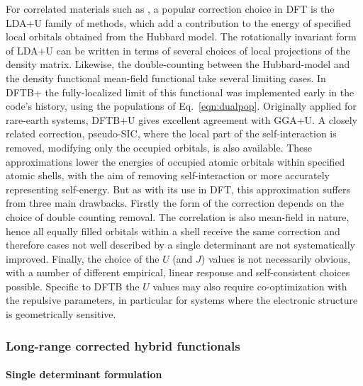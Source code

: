 \documentclass{revtex4-1}
\newcommand{\dftbp}{DFTB+}
\begin{document}
For correlated materials such as , a popular correction choice in DFT is
the LDA+U family of methods,\cite{Anisimov_1997} which add a contribution to the
energy of specified local orbitals obtained from the Hubbard model. The
rotationally invariant\cite{PhysRevB.57.1505} form of LDA+U can be written in
terms of several choices of local projections of the density
matrix.\cite{PhysRevB.73.045110} Likewise, the double-counting between the
Hubbard-model and the density functional mean-field functional take several
limiting cases.\cite{PhysRevB.67.153106} In \dftbp{} the fully-localized limit
of this functional was implemented early in the code's
history,\cite{hourahine07} using the populations of
Eq.~\eqref{eqn:dualpop}. Originally applied for rare-earth
systems,\cite{doi:10.1002/pssc.200778667} DFTB+U gives excellent agreement with
GGA+U.\cite{doi:10.1063/1.5085190} A closely related correction,
pseudo-SIC,\cite{PhysRevB.67.125109} where the local part of the
self-interaction is removed, modifying only the occupied orbitals, is also
available.  These approximations lower the energies of occupied atomic orbitals
within specified atomic shells, with the aim of removing self-interaction or
more accurately representing self-energy. But as with its use in DFT, this
approximation suffers from three main drawbacks. Firstly the form of the
correction depends on the choice of double counting
removal.\cite{PhysRevB.79.035103} The correlation is also mean-field in nature,
hence all equally filled orbitals within a shell receive the same correction and
therefore cases not well described by a single determinant are not
systematically improved. Finally, the choice of the $U$ (and $J$) values is not
necessarily obvious, with a number of different empirical, linear response and
self-consistent choices possible. Specific to
DFTB\cite{doi:10.1021/acs.jpcc.6b10557} the $U$ values may also require
co-optimization with the repulsive parameters, in particular for systems where
the electronic structure is geometrically sensitive.

\subsubsection{Long-range corrected hybrid functionals}

\paragraph{Single determinant formulation}
\end{document}
